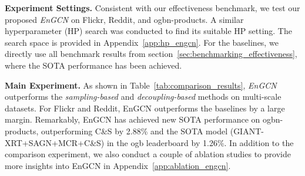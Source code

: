 \message{ !name(main.tex)}\documentclass{article}
\begin{document}
\textbf{Experiment Settings.} Consistent with our effectiveness benchmark, we test our proposed \textit{EnGCN} on Flickr, Reddit, and ogbn-products. A similar hyperparameter (HP) search was conducted to find its suitable HP setting. The search space is provided in Appendix~\ref{app:hp_engcn}. For the baselines, we directly use all benchmark results from section~\ref{sec:benchmarking_effectiveness}, where the SOTA performance has been achieved.

\textbf{Main Experiment.} As shown in Table~\ref{tab:comparison_results}, \textit{EnGCN} outperforms the \textit{sampling-based} and \textit{decoupling-based} methods on multi-scale datasets. For Flickr and Reddit, EnGCN outperforms the baselines by a large margin. Remarkably, EnGCN has achieved new SOTA performance on ogbn-products, outperforming C\&S by 2.88\% and the SOTA model (GIANT-XRT+SAGN+MCR+C\&S) in the ogb leaderboard by 1.26\%. In addition to the comparison experiment, we also conduct a couple of ablation studies to provide more insights into EnGCN in Appendix~\ref{app:ablation_engcn}.
\end{document}

